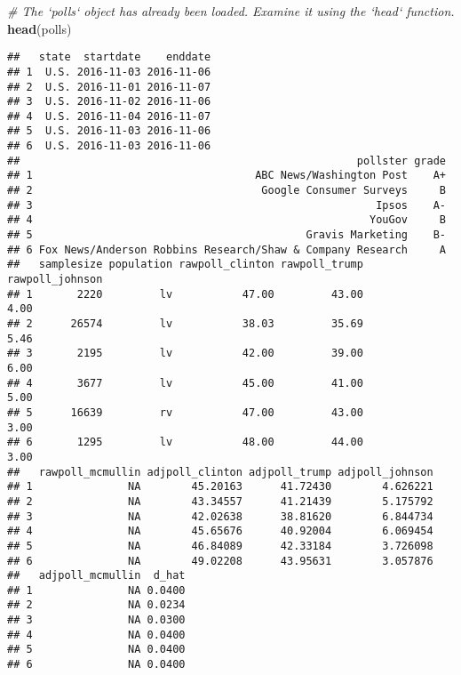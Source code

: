 \documentclass[]{article}
\newenvironment{Shaded}{\begin{snugshade}}{\end{snugshade}}
\newcommand{\KeywordTok}[1]{\textcolor[rgb]{0.13,0.29,0.53}{\textbf{#1}}}
\newcommand{\CommentTok}[1]{\textcolor[rgb]{0.56,0.35,0.01}{\textit{#1}}}
\newcommand{\NormalTok}[1]{#1}
\begin{document}
\begin{Shaded}
\begin{Highlighting}[]
\CommentTok{# The `polls` object has already been loaded. Examine it using the `head` function.}
\KeywordTok{head}\NormalTok{(polls)}
\end{Highlighting}
\end{Shaded}

\begin{verbatim}
##   state  startdate    enddate
## 1  U.S. 2016-11-03 2016-11-06
## 2  U.S. 2016-11-01 2016-11-07
## 3  U.S. 2016-11-02 2016-11-06
## 4  U.S. 2016-11-04 2016-11-07
## 5  U.S. 2016-11-03 2016-11-06
## 6  U.S. 2016-11-03 2016-11-06
##                                                     pollster grade
## 1                                   ABC News/Washington Post    A+
## 2                                    Google Consumer Surveys     B
## 3                                                      Ipsos    A-
## 4                                                     YouGov     B
## 5                                           Gravis Marketing    B-
## 6 Fox News/Anderson Robbins Research/Shaw & Company Research     A
##   samplesize population rawpoll_clinton rawpoll_trump rawpoll_johnson
## 1       2220         lv           47.00         43.00            4.00
## 2      26574         lv           38.03         35.69            5.46
## 3       2195         lv           42.00         39.00            6.00
## 4       3677         lv           45.00         41.00            5.00
## 5      16639         rv           47.00         43.00            3.00
## 6       1295         lv           48.00         44.00            3.00
##   rawpoll_mcmullin adjpoll_clinton adjpoll_trump adjpoll_johnson
## 1               NA        45.20163      41.72430        4.626221
## 2               NA        43.34557      41.21439        5.175792
## 3               NA        42.02638      38.81620        6.844734
## 4               NA        45.65676      40.92004        6.069454
## 5               NA        46.84089      42.33184        3.726098
## 6               NA        49.02208      43.95631        3.057876
##   adjpoll_mcmullin  d_hat
## 1               NA 0.0400
## 2               NA 0.0234
## 3               NA 0.0300
## 4               NA 0.0400
## 5               NA 0.0400
## 6               NA 0.0400
\end{verbatim}
\end{document}
